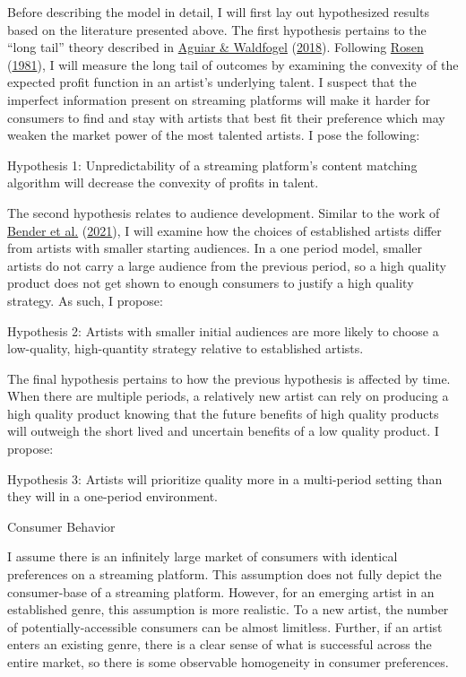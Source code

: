 \documentclass[
]{article}
\begin{document}
Before describing the model in detail, I will first lay out hypothesized
results based on the literature presented above. The first hypothesis
pertains to the ``long tail'' theory described in
\protect\hyperlink{ref-aguiarQualityPredictabilityWelfare2018}{Aguiar \&
Waldfogel}
(\protect\hyperlink{ref-aguiarQualityPredictabilityWelfare2018}{2018}).
Following \protect\hyperlink{ref-rosenEconomicsSuperstars1981a}{Rosen}
(\protect\hyperlink{ref-rosenEconomicsSuperstars1981a}{1981}), I will
measure the long tail of outcomes by examining the convexity of the
expected profit function in an artist's underlying talent. I suspect
that the imperfect information present on streaming platforms will make
it harder for consumers to find and stay with artists that best fit
their preference which may weaken the market power of the most talented
artists. I pose the following:

Hypothesis 1: Unpredictability of a streaming platform's content
matching algorithm will decrease the convexity of profits in talent.

The second hypothesis relates to audience development. Similar to the
work of \protect\hyperlink{ref-benderAttractingArtistsMusic2021}{Bender
et al.}
(\protect\hyperlink{ref-benderAttractingArtistsMusic2021}{2021}), I will
examine how the choices of established artists differ from artists with
smaller starting audiences. In a one period model, smaller artists do
not carry a large audience from the previous period, so a high quality
product does not get shown to enough consumers to justify a high quality
strategy. As such, I propose:

Hypothesis 2: Artists with smaller initial audiences are more likely to
choose a low-quality, high-quantity strategy relative to established
artists.

The final hypothesis pertains to how the previous hypothesis is affected
by time. When there are multiple periods, a relatively new artist can
rely on producing a high quality product knowing that the future
benefits of high quality products will outweigh the short lived and
uncertain benefits of a low quality product. I propose:

Hypothesis 3: Artists will prioritize quality more in a multi-period
setting than they will in a one-period environment.

Consumer Behavior

I assume there is an infinitely large market of consumers with identical
preferences on a streaming platform. This assumption does not fully
depict the consumer-base of a streaming platform. However, for an
emerging artist in an established genre, this assumption is more
realistic. To a new artist, the number of potentially-accessible
consumers can be almost limitless. Further, if an artist enters an
existing genre, there is a clear sense of what is successful across the
entire market, so there is some observable homogeneity in consumer
preferences.
\end{document}
